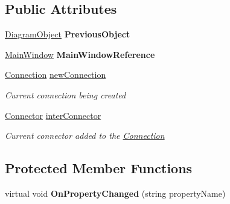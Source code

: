 \subsection*{Public Attributes}
\begin{DoxyCompactItemize}
\item 
\hypertarget{class_prototipo_t_f_g_1_1_main_view_model_a8e2d21f817bfbfb60a4ad72052a3bf05}{}\hyperlink{class_prototipo_t_f_g_1_1_diagram_object}{Diagram\+Object} {\bfseries Previous\+Object}\label{class_prototipo_t_f_g_1_1_main_view_model_a8e2d21f817bfbfb60a4ad72052a3bf05}

\item 
\hypertarget{class_prototipo_t_f_g_1_1_main_view_model_ae4f320eded93bfc60a0760b5b460697d}{}\hyperlink{class_prototipo_t_f_g_1_1_main_window}{Main\+Window} {\bfseries Main\+Window\+Reference}\label{class_prototipo_t_f_g_1_1_main_view_model_ae4f320eded93bfc60a0760b5b460697d}

\item 
\hyperlink{class_prototipo_t_f_g_1_1_connection}{Connection} \hyperlink{class_prototipo_t_f_g_1_1_main_view_model_ad831b48de3245d6140e793b139248766}{new\+Connection}
\begin{DoxyCompactList}\small\item\em Current connection being created \end{DoxyCompactList}\item 
\hyperlink{class_prototipo_t_f_g_1_1_connector}{Connector} \hyperlink{class_prototipo_t_f_g_1_1_main_view_model_a8d14855d3cd1bc0589754f52ca171fc8}{inter\+Connector}
\begin{DoxyCompactList}\small\item\em Current connector added to the \hyperlink{class_prototipo_t_f_g_1_1_connection}{Connection} \end{DoxyCompactList}\end{DoxyCompactItemize}
\subsection*{Protected Member Functions}
\begin{DoxyCompactItemize}
\item 
\hypertarget{class_prototipo_t_f_g_1_1_main_view_model_ad39c44974e0eab73c78992ec8e6d97ae}{}virtual void {\bfseries On\+Property\+Changed} (string property\+Name)\label{class_prototipo_t_f_g_1_1_main_view_model_ad39c44974e0eab73c78992ec8e6d97ae}

\end{DoxyCompactItemize}
